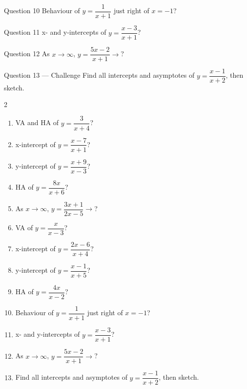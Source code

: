 \documentclass[11pt]{article}
\begin{document}
\begin{qbox}{Question 10}
Behaviour of $y=\dfrac{1}{x+1}$ just right of $x=-1$?\workspace{2.4cm}
\end{qbox}

\begin{qbox}{Question 11}
x- and y-intercepts of $y=\dfrac{x-3}{x+1}$?\workspace{2.4cm}
\end{qbox}

\begin{qbox}{Question 12}
As $x\to\infty$, $y=\dfrac{5x-2}{x+1}\to$?\workspace{2.4cm}
\end{qbox}

\begin{qbox}{Question 13 --- Challenge}
Find all intercepts and asymptotes of $y=\dfrac{x-1}{x+2}$, then sketch.\workspace{4cm}
\end{qbox}

\clearpage
{}

\begin{recapbox}
\begin{multicols}{2}
\small
\begin{enumerate}[leftmargin=*,itemsep=3pt]
  \item VA and HA of $y=\dfrac{3}{x+4}$?
  \item x-intercept of $y=\dfrac{x-7}{x+1}$?
  \item y-intercept of $y=\dfrac{x+9}{x-3}$?
  \item HA of $y=\dfrac{8x}{x+6}$?
  \item As $x\to\infty$, $y=\dfrac{3x+1}{2x-5}\to$?
  \item VA of $y=\dfrac{x}{x-3}$?
  \item x-intercept of $y=\dfrac{2x-6}{x+4}$?
  \item y-intercept of $y=\dfrac{x-1}{x+5}$?
  \item HA of $y=\dfrac{4x}{x-2}$?
  \item Behaviour of $y=\dfrac{1}{x+1}$ just right of $x=-1$?
  \item x- and y-intercepts of $y=\dfrac{x-3}{x+1}$?
  \item As $x\to\infty$, $y=\dfrac{5x-2}{x+1}\to$?
  \item Find all intercepts and asymptotes of $y=\dfrac{x-1}{x+2}$, then sketch.
\end{enumerate}
\end{multicols}
\end{recapbox}
\end{document}
